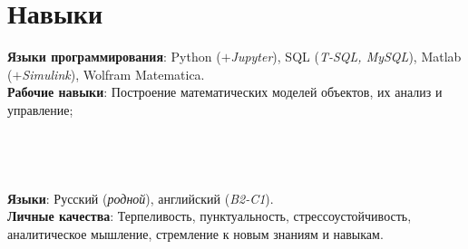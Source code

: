 \documentclass[letterpaper,11pt]{article}
\begin{document}
\section{Навыки}
 \begin{itemize}[leftmargin=0.15in, label={}]
    \small{\item{
     \textbf{Языки программирования}{: Python ($+$\textit{Jupyter}), SQL (\textit{T-SQL, MySQL}), Matlab ($+$\textit{Simulink}), Wolfram Matematica.} \\[4pt]
     \textbf{Рабочие навыки}{: Построение математических моделей объектов, их анализ и управление;}\\
    \\
\\
\\
\\[4pt]
    \textbf{Языки}{: Русский (\textit{родной}), английский (\textit{B2-C1}).}\\[4pt]
    \textbf{Личные качества}{: Терпеливость, пунктуальность, стрессоустойчивость, аналитическое мышление, стремление к новым знаниям и навыкам.}
    }}
 \end{itemize}
 \vspace{-16pt}


\end{document}
